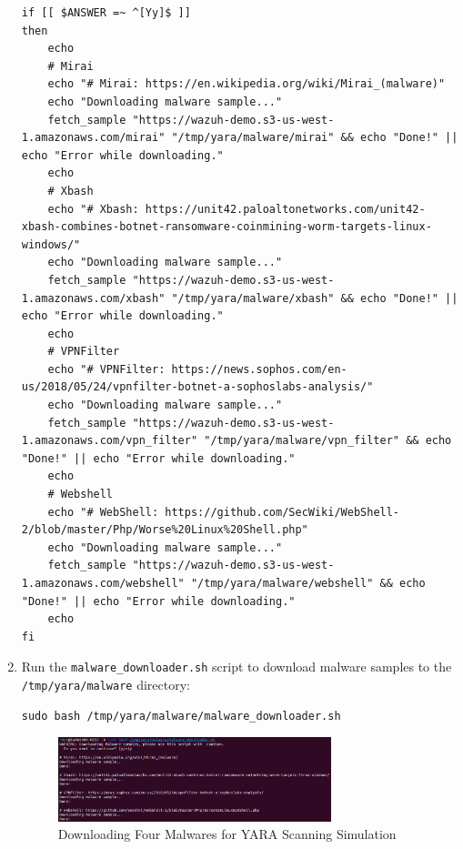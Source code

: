 \begin{enumerate}
\begin{verbatim}
if [[ $ANSWER =~ ^[Yy]$ ]]
then
    echo
    # Mirai
    echo "# Mirai: https://en.wikipedia.org/wiki/Mirai_(malware)"
    echo "Downloading malware sample..."
    fetch_sample "https://wazuh-demo.s3-us-west-1.amazonaws.com/mirai" "/tmp/yara/malware/mirai" && echo "Done!" || echo "Error while downloading."
    echo
    # Xbash
    echo "# Xbash: https://unit42.paloaltonetworks.com/unit42-xbash-combines-botnet-ransomware-coinmining-worm-targets-linux-windows/"
    echo "Downloading malware sample..."
    fetch_sample "https://wazuh-demo.s3-us-west-1.amazonaws.com/xbash" "/tmp/yara/malware/xbash" && echo "Done!" || echo "Error while downloading."
    echo
    # VPNFilter
    echo "# VPNFilter: https://news.sophos.com/en-us/2018/05/24/vpnfilter-botnet-a-sophoslabs-analysis/"
    echo "Downloading malware sample..."
    fetch_sample "https://wazuh-demo.s3-us-west-1.amazonaws.com/vpn_filter" "/tmp/yara/malware/vpn_filter" && echo "Done!" || echo "Error while downloading."
    echo
    # Webshell
    echo "# WebShell: https://github.com/SecWiki/WebShell-2/blob/master/Php/Worse%20Linux%20Shell.php"
    echo "Downloading malware sample..."
    fetch_sample "https://wazuh-demo.s3-us-west-1.amazonaws.com/webshell" "/tmp/yara/malware/webshell" && echo "Done!" || echo "Error while downloading."
    echo
fi
    \end{verbatim}
    \item Run the \texttt{malware\_downloader.sh} script to download malware samples to the \texttt{/tmp/yara/malware} directory:
    \begin{verbatim}
sudo bash /tmp/yara/malware/malware_downloader.sh
    \end{verbatim}
    \begin{figure}[H]
        \centering
        \includegraphics[width=0.75\textwidth]{images/malware-detection/yara/5.png}
        \caption{Downloading Four Malwares for YARA Scanning Simulation}
        \label{fig:yara-malware-download}
    \end{figure}
\end{enumerate}

